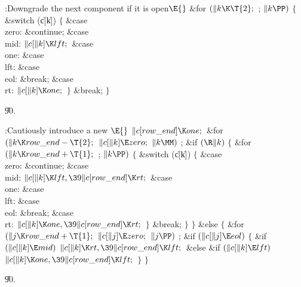 \B{}:Downgrade the next component if it is open\X${}\E{}$\6
\&{for} ${}(\|k\K\T{2};{}$  ; ${}\|k\PP){}$\5
${}\{{}$\1\6
\&{switch} (\|c[\|k])\5
${}\{{}$\1\6
\4\&{case} \\{zero}:\5
\&{continue};\6
\4\&{case} \\{mid}:\5
${}\|c[\|k]\K\\{lft};{}$\6
\4\&{case} \\{one}:\5
\&{case} \\{lft}:\5
\&{case} \\{eol}:\5
\&{break};\6
\4\&{case} \\{rt}:\5
${}\|c[\|k]\K\\{one};{}$\6
\4${}\}{}$\2\6
\&{break};\6
\4${}\}{}$\2\par
\U90.\fi

\B{}:Cautiously introduce a new \X${}\E{}$\6
$\|c[\\{row\_end}]\K\\{one};{}$\6
\&{for} ${}(\|k\K\\{row\_end}-\T{2};{}$ ${}\|c[\|k]\E\\{zero};{}$ ${}\|k\MM){}$%
\1\5
;\2\6
\&{if} ${}(\R\|k){}$\5
${}\{{}$\1\6
\&{for} ${}(\|k\K\\{row\_end}+\T{1};{}$  ; ${}\|k\PP){}$\5
${}\{{}$\1\6
\&{switch} (\|c[\|k])\5
${}\{{}$\1\6
\4\&{case} \\{zero}:\5
\&{continue};\6
\4\&{case} \\{mid}:\5
${}\|c[\|k]\K\\{lft},\39\|c[\\{row\_end}]\K\\{rt};{}$\6
\4\&{case} \\{one}:\5
\&{case} \\{lft}:\5
\&{case} \\{eol}:\5
\&{break};\6
\4\&{case} \\{rt}:\5
${}\|c[\|k]\K\\{one},\39\|c[\\{row\_end}]\K\\{rt};{}$\6
\4${}\}{}$\2\6
\&{break};\6
\4${}\}{}$\2\6
\4${}\}{}$\5
\2\&{else}\5
${}\{{}$\1\6
\&{for} ${}(\|j\K\\{row\_end}+\T{1};{}$ ${}\|c[\|j]\E\\{zero};{}$ ${}\|j\PP){}$%
\1\5
;\2\6
\&{if} ${}(\|c[\|j]\E\\{eol}){}$\5
${}\{{}$\1\6
\&{if} ${}(\|c[\|k]\E\\{mid}){}$\1\5
${}\|c[\|k]\K\\{rt},\39\|c[\\{row\_end}]\K\\{lft};{}$\2\6
\&{else} \&{if} ${}(\|c[\|k]\E\\{lft}){}$\1\5
${}\|c[\|k]\K\\{one},\39\|c[\\{row\_end}]\K\\{lft};{}$\2\6
\4${}\}{}$\2\6
\4${}\}{}$\2\par
\U90.\fi

